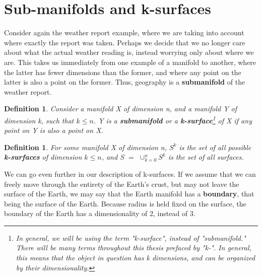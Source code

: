 \documentclass{book}
\newtheorem{defn}[equation]{Definition}
\begin{document}
\section{Sub-manifolds and k-surfaces}

Consider again the weather report example, where we are taking into account where exactly the report was taken. Perhaps we decide that we no longer care about what the actual weather reading is, instead worrying only about where we are. This takes us immediately from one example of a manifold to another, where the latter has fewer dimensions than the former, and where any point on the latter is also a point on the former. Thus, geography is a \textbf{submanifold} of the weather report.


\begin{defn}
	Consider a manifold X of dimension n, and a manifold Y of dimension k, such that $k \leq n$. Y is a \textbf{submanifold} or a \textbf{k-surface}\footnote{In general, we will be using the term "k-surface", instead of "submanifold." There will be many terms throughout this thesis prefaced by "k-". In general, this means that the object in question has k dimensions, and can be organized by their dimensionality.} of X if any point on Y is also a point on X. 
\end{defn}




\begin{defn}
	For some manifold X of dimension n, $S^k$ is the set of all possible \textbf{k-surfaces} of dimension $k \leq n$, and S $=$ $\cup^n_{k=0}S^k$ is the set of all surfaces. 
\end{defn}

We can go even further in our description of k-surfaces. If we assume that we can freely move through the entirety of the Earth's crust, but may not leave the surface of the Earth, we may say that the Earth manifold has a \textbf{boundary}, that being the surface of the Earth. Because radius is held fixed on the surface, the boundary of the Earth has a dimensionality of 2, instead of 3. 
\end{document}
